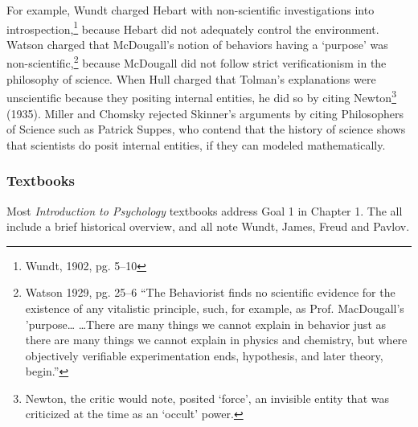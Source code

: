 \begin{refsection}
For example, Wundt charged Hebart with non-scientific investigations into introspection,\footnote{Wundt, 1902, pg. 5--10} because Hebart did not adequately control the environment. Watson charged that McDougall's notion of behaviors having a `purpose' was non-scientific,\footnote{Watson 1929, pg. 25--6 “The Behaviorist finds no scientific evidence for the existence of any vitalistic principle, such, for example, as Prof. MacDougall's 'purpose{\ldots} {\ldots}There are many things we cannot explain in behavior just as there are many things we cannot explain in physics and chemistry, but where objectively verifiable experimentation ends, hypothesis, and later theory, begin.”} because McDougall did not follow strict verificationism in the philosophy of science. When Hull charged that Tolman's explanations were unscientific because they positing internal entities, he did so by citing Newton\footnote{Newton, the critic would note, posited `force', an invisible entity that was criticized at the time as an `occult' power.} (1935). Miller and Chomsky rejected Skinner's arguments by citing Philosophers of Science such as Patrick Suppes, who contend that the history of science shows that scientists do posit internal entities, if they can modeled mathematically.

\subsubsection{Textbooks}
\label{textbooks}

Most \emph{Introduction to Psychology} textbooks address Goal 1 in Chapter 1. The all include a brief historical overview, and all note Wundt, James, Freud and Pavlov. 


\end{refsection}
